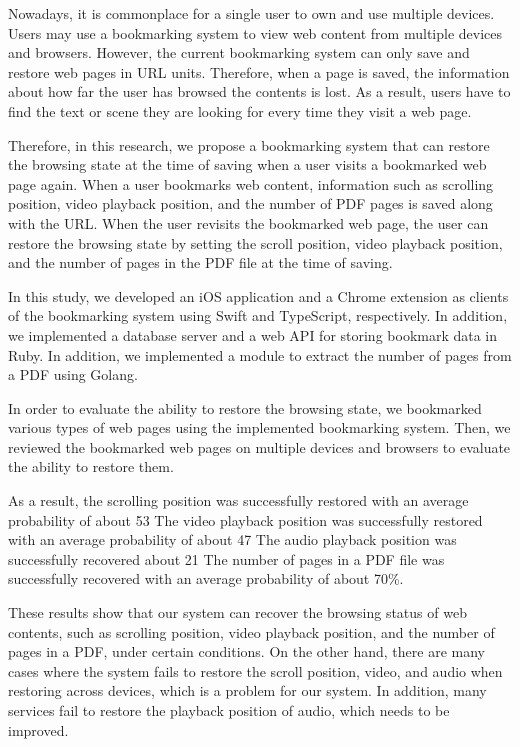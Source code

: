 \begin{eabstract}

  Nowadays, it is commonplace for a single user to own and use multiple devices.
  Users may use a bookmarking system to view web content from multiple devices and browsers.
  However, the current bookmarking system can only save and restore web pages in URL units.
  Therefore, when a page is saved, the information about how far the user has browsed the contents is lost.
  As a result, users have to find the text or scene they are looking for every time they visit a web page.  

  Therefore, in this research, we propose a bookmarking system that can restore the browsing state at the time of saving when a user visits a bookmarked web page again.
  When a user bookmarks web content, information such as scrolling position, video playback position, and the number of PDF pages is saved along with the URL.
  When the user revisits the bookmarked web page, the user can restore the browsing state by setting the scroll position, video playback position, and the number of pages in the PDF file at the time of saving.

  In this study, we developed an iOS application and a Chrome extension as clients of the bookmarking system using Swift and TypeScript, respectively.
  In addition, we implemented a database server and a web API for storing bookmark data in Ruby.
  In addition, we implemented a module to extract the number of pages from a PDF using Golang.

  In order to evaluate the ability to restore the browsing state, we bookmarked various types of web pages using the implemented bookmarking system.
  Then, we reviewed the bookmarked web pages on multiple devices and browsers to evaluate the ability to restore them.

  As a result, the scrolling position was successfully restored with an average probability of about 53%
  The video playback position was successfully restored with an average probability of about 47%
  The audio playback position was successfully recovered about 21%
  The number of pages in a PDF file was successfully recovered with an average probability of about 70\%.

  These results show that our system can recover the browsing status of web contents, such as scrolling position, video playback position, and the number of pages in a PDF, under certain conditions.
  On the other hand, there are many cases where the system fails to restore the scroll position, video, and audio when restoring across devices, which is a problem for our system.
  In addition, many services fail to restore the playback position of audio, which needs to be improved.

\end{eabstract}
